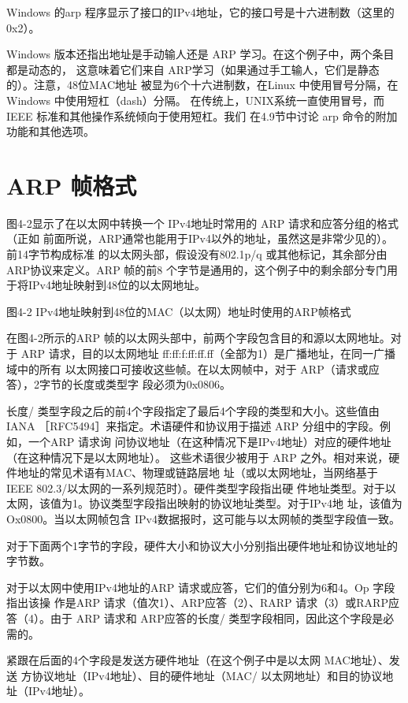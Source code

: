 Windows 的arp 程序显示了接口的IPv4地址，它的接口号是十六进制数（这里的0x2）。

Windows 版本还指出地址是手动输人还是 ARP 学习。在这个例子中，两个条目都是动态的，
这意味着它们来自 ARP学习（如果通过手工输人，它们是静态的）。注意，48位MAC地址
被显为6个十六进制数，在Linux 中使用冒号分隔，在Windows 中使用短杠（dash）分隔。
在传统上，UNIX系统一直使用冒号，而IEEE 标准和其他操作系统倾向于使用短杠。我们
在4.9节中讨论 arp 命令的附加功能和其他选项。

\section{ARP 帧格式}

图4-2显示了在以太网中转换一个 IPv4地址时常用的 ARP 请求和应答分组的格式（正如
前面所说，ARP通常也能用于IPv4以外的地址，虽然这是非常少见的）。前14字节构成标准
的以太网头部，假设没有802.1p/q 或其他标记，其余部分由 ARP协议来定义。ARP 帧的前8
个字节是通用的，这个例子中的剩余部分专门用于将IPv4地址映射到48位的以太网地址。

图4-2 IPv4地址映射到48位的MAC（以太网）地址时使用的ARP帧格式

在图4-2所示的ARP 帧的以太网头部中，前两个字段包含目的和源以太网地址。对于
ARP 请求，目的以太网地址 ff:ff:f:ff:ff.ff（全部为1）是广播地址，在同一广播域中的所有
以太网接口可接收这些帧。在以太网帧中，对于 ARP（请求或应答），2字节的长度或类型字
段必须为0x0806。

长度/ 类型字段之后的前4个字段指定了最后4个字段的类型和大小。这些值由IANA
［RFC5494］来指定。术语硬件和协议用于描述 ARP 分组中的字段。例如，一个ARP 请求询
问协议地址（在这种情况下是IPv4地址）对应的硬件地址（在这种情况下是以太网地址）。
这些术语很少被用于 ARP 之外。相对来说，硬件地址的常见术语有MAC、物理或链路层地
址（或以太网地址，当网络基于 IEEE 802.3/以太网的一系列规范时）。硬件类型字段指出硬
件地址类型。对于以太网，该值为1。协议类型字段指出映射的协议地址类型。对于IPv4地
址，该值为Ox0800。当以太网帧包含 IPv4数据报时，这可能与以太网帧的类型字段值一致。

对于下面两个1字节的字段，硬件大小和协议大小分别指出硬件地址和协议地址的字节数。

对于以太网中使用IPv4地址的ARP 请求或应答，它们的值分别为6和4。Op 字段指出该操
作是ARP 请求（值次1）、ARP应答（2）、RARP 请求（3）或RARP应答（4）。由于 ARP
请求和 ARP应答的长度/ 类型字段相同，因此这个字段是必需的。

紧跟在后面的4个字段是发送方硬件地址（在这个例子中是以太网 MAC地址）、发送
方协议地址（IPv4地址）、目的硬件地址（MAC/ 以太网地址）和目的协议地址（IPv4地址）。

